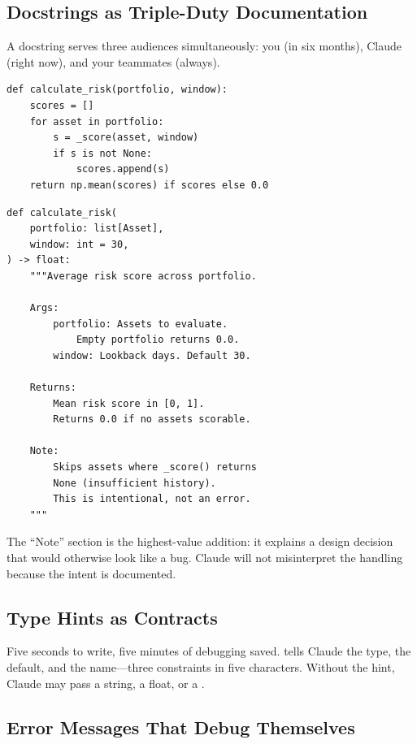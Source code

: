 \subsection{Docstrings as Triple-Duty Documentation}

A docstring serves three audiences simultaneously:
you (in six months), Claude (right now), and your teammates (always).

\begin{fullwidth}
\begin{beforeafter}[Docstrings]
\before
\begin{verbatim}
def calculate_risk(portfolio, window):
    scores = []
    for asset in portfolio:
        s = _score(asset, window)
        if s is not None:
            scores.append(s)
    return np.mean(scores) if scores else 0.0
\end{verbatim}

\after
\begin{verbatim}
def calculate_risk(
    portfolio: list[Asset],
    window: int = 30,
) -> float:
    """Average risk score across portfolio.

    Args:
        portfolio: Assets to evaluate.
            Empty portfolio returns 0.0.
        window: Lookback days. Default 30.

    Returns:
        Mean risk score in [0, 1].
        Returns 0.0 if no assets scorable.

    Note:
        Skips assets where _score() returns
        None (insufficient history).
        This is intentional, not an error.
    """
\end{verbatim}
\end{beforeafter}
\end{fullwidth}

The ``Note'' section is the highest-value addition: it explains a design
decision that would otherwise look like a bug. Claude will not
misinterpret the  handling because the intent is documented.

\subsection{Type Hints as Contracts}

Five seconds to write, five minutes of debugging saved.
 tells Claude the type, the default,
and the name---three constraints in five characters.
Without the hint, Claude may pass a string, a float, or a .

\subsection{Error Messages That Debug Themselves}

